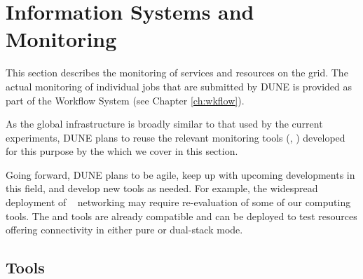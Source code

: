\documentclass[../main-v1.tex]{subfiles}
\begin{document}
\chapter{Information Systems and Monitoring }
\label{ch:mon}

\FPadd\MonEtfTotalPeople\MonEtfOpsPeople\MonEtfDevPeople %

This section %
describes the monitoring of services and resources on the grid.  The actual monitoring of individual jobs that are submitted by DUNE 
is provided as part of the Workflow System (see Chapter \ref{ch:wkflow}).

As the global infrastructure is broadly similar to that used by the current  experiments, DUNE plans to reuse the relevant monitoring tools (, ) developed for this purpose by the  which we cover in this section.  %

Going forward, DUNE plans to be agile, keep up with upcoming developments in this field, and develop new tools as needed. For example, the widespread deployment of ~\cite{bib:ipv6TaskForce} networking may require re-evaluation of some of our computing tools.  The  and  tools are already  compatible and can be deployed to test resources offering  connectivity in either pure or dual-stack mode.

\section{Tools}
\label{sec:mon:xyz}  %
\end{document}
